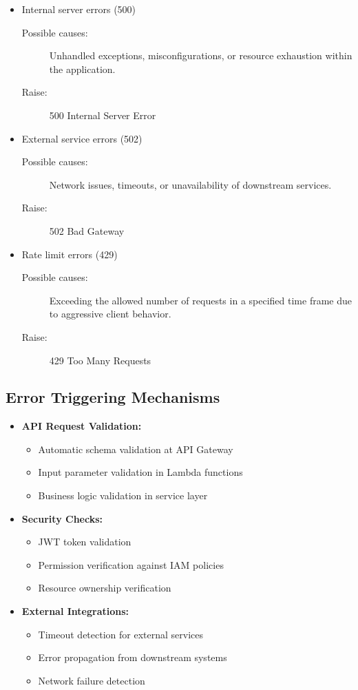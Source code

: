 \documentclass[a4paper, 11pt]{scrreprt}
\begin{document}
\begin{itemize}
    \item Internal server errors (500) 
        \begin{description}
            \item[Possible causes:] Unhandled exceptions, misconfigurations, or resource exhaustion within the application.
            \item[Raise:] 500 Internal Server Error
        \end{description}
    \item External service errors (502) 
        \begin{description}
            \item[Possible causes:] Network issues, timeouts, or unavailability of downstream services.
            \item[Raise:] 502 Bad Gateway
        \end{description}
    \item Rate limit errors (429) 
        \begin{description}
            \item[Possible causes:] Exceeding the allowed number of requests in a specified time frame due to aggressive client behavior.
            \item[Raise:] 429 Too Many Requests
        \end{description}
\end{itemize}


\subsection{Error Triggering Mechanisms}
\begin{itemize}
    \item \textbf{API Request Validation:}
    \begin{itemize}
        \item Automatic schema validation at API Gateway
        \item Input parameter validation in Lambda functions
        \item Business logic validation in service layer
    \end{itemize}
    
    \item \textbf{Security Checks:}
    \begin{itemize}
        \item JWT token validation
        \item Permission verification against IAM policies
        \item Resource ownership verification
    \end{itemize}
    
    \item \textbf{External Integrations:}
    \begin{itemize}
        \item Timeout detection for external services
        \item Error propagation from downstream systems
        \item Network failure detection
    \end{itemize}
\end{itemize}
\end{document}
